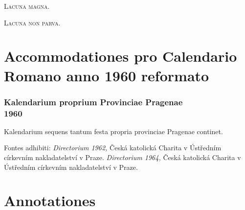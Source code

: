 \documentclass[12pt, a5paper, twoside]{book}
\begin{document}
\vfill
{\Large \textsc{Lacuna magna.}}




\vfill
{\Large \textsc{Lacuna non parva.}}

\part{Accommodationes pro Calendario Romano anno 1960 reformato}

\section*{Kalendarium proprium Provinciae Pragenae\\1960}

{\footnotesize
  Kalendarium sequens tantum festa propria provinciae Pragenae
  continet.

  Fontes adhibiti:
  \emph{Directorium 1962,} Česká katolická Charita v Ústředním církevním nakladatelství v Praze.
  \emph{Directorium 1964,} Česká katolická Charita v Ústředním církevním nakladatelství v Praze.
}


\cleardoublepage




\part{Annotationes}




\printbibliography
\end{document}
